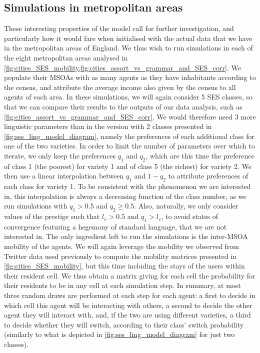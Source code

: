 \documentclass[../thesis.tex]{subfiles}
\begin{document}
\subsection{Simulations in metropolitan areas}
These interesting properties of the model call for further investigation, and particularly how it would fare when initialised with the actual data that we have in the metropolitan areas of England.
We thus wish to run simulations in each of the eight metropolitan areas analysed in \cref{fig:cities_SES_mobility,fig:cities_assort_vs_grammar_and_SES_corr}.
We populate their \acp{MSOA} with as many agents as they have inhabitants according to the census, and attribute the average income also given by the census to all agents of each area.
In these simulations, we will again consider 5 \ac{SES} classes, so that we can compare their results to the outputs of our data analysis, such as \cref{fig:cities_assort_vs_grammar_and_SES_corr}.
We would therefore need 3 more linguistic parameters than in the version with 2 classes presented in \cref{fig:ses_ling_model_diagram}, namely the preferences of each additional class for one of the two varieties.
In order to limit the number of parameters over which to iterate, we only keep the preferences $q_1$ and $q_2$, which are this time the preference of class 1 (the poorest) for variety 1 and of class 5 (the richest) for variety 2.
We then use a linear interpolation between $q_1$ and $1 - q_2$ to attribute preferences of each class for variety 1.
To be consistent with the phenomenon we are interested in, this interpolation is always a decreasing function of the class number, as we run simulations with $q_1 > 0.5$ and $q_2 \geq 0.5$.
Also, naturally, we only consider values of the prestige such that $l_v > 0.5$ and $q_1 > l_v$, to avoid states of convergence featuring a hegemony of standard language, that we are not interested in.
The only ingredient left to run the simulations is the inter-\ac{MSOA} mobility of the agents.
We will again leverage the mobility we observed from Twitter data used previously to compute the mobility matrices presented in \cref{fig:cities_SES_mobility}, but this time including the stays of the users within their resident cell.
We thus obtain a matrix giving for each cell the probability for their residents to be in any cell at each simulation step.
In summary, at most three random draws are performed at each step for each agent: a first to decide in which cell this agent will be interacting with others, a second to decide the other agent they will interact with, and, if the two are using different varieties, a third to decide whether they will switch, according to their class' switch probability (similarly to what is depicted in \cref{fig:ses_ling_model_diagram} for just two classes).
\end{document}
